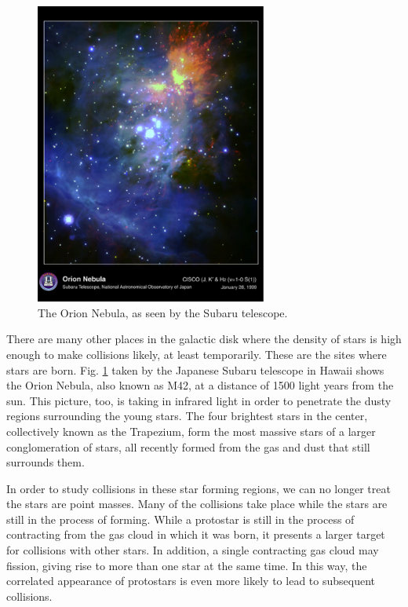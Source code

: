 \begin{figure}[ht]
\centering
\includegraphics[width=3in]{chap1/orion.eps}
\caption[The Orion Nebula]
{The Orion Nebula, as seen by the Subaru telescope.}
\label{fig:orion}
\end{figure}

There are many other places in the galactic disk where the density of
stars is high enough to make collisions likely, at least temporarily.
These are the sites where stars are born.  Fig. \ref{fig:orion} taken
by the Japanese Subaru telescope in Hawaii shows the Orion Nebula,
also known as M42, at a distance of 1500 light years from the sun.
This picture, too, is taking in infrared light in order to penetrate
the dusty regions surrounding the young stars.  The four brightest
stars in the center, collectively known as the Trapezium, form the
most massive stars of a larger conglomeration of stars, all recently
formed from the gas and dust that still surrounds them.

In order to study collisions in these star forming regions, we can no
longer treat the stars are point masses.  Many of the collisions take
place while the stars are still in the process of forming.  While a
protostar is still in the process of contracting from the gas cloud
in which it was born, it presents a larger target for collisions with
other stars.  In addition, a single contracting gas cloud may fission,
giving rise to more than one star at the same time.  In this way, the
correlated appearance of protostars is even more likely to lead to
subsequent collisions.

